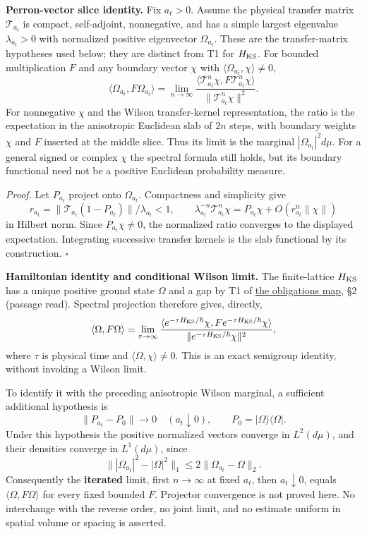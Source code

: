 \documentclass[11pt,a4paper]{article}
\begin{document}
\textbf{Perron-vector slice identity.} Fix \(a_t>0\). Assume the
physical transfer matrix \(\mathcal T_{a_t}\) is compact, self-adjoint,
nonnegative, and has a simple largest eigenvalue \(\lambda_{a_t}>0\)
with normalized positive eigenvector \(\Omega_{a_t}\). These are the
transfer-matrix hypotheses used below; they are distinct from T1 for
\(H_{\rm KS}\). For bounded multiplication \(F\) and any boundary vector
\(\chi\) with \(\langle\Omega_{a_t},\chi\rangle\ne0\),
\[\langle\Omega_{a_t},F\Omega_{a_t}\rangle
=\lim_{n\to\infty}
\frac{\langle\mathcal T_{a_t}^{n}\chi,
F\mathcal T_{a_t}^{n}\chi\rangle}
{\|\mathcal T_{a_t}^{n}\chi\|^2}.\] For nonnegative \(\chi\) and the
Wilson transfer-kernel representation, the ratio is the expectation in
the anisotropic Euclidean slab of \(2n\) steps, with boundary weights
\(\chi\) and \(F\) inserted at the middle slice. Thus its limit is the
marginal \(|\Omega_{a_t}|^2d\mu\). For a general signed or complex
\(\chi\) the spectral formula still holds, but its boundary functional
need not be a positive Euclidean probability measure.

\emph{Proof.} Let \(P_{a_t}\) project onto \(\Omega_{a_t}\). Compactness
and simplicity give
\[r_{a_t}=\|\mathcal T_{a_t}(1-P_{a_t})\|/\lambda_{a_t}<1,
\qquad
\lambda_{a_t}^{-n}\mathcal T_{a_t}^n\chi
=P_{a_t}\chi+O(r_{a_t}^n\|\chi\|)\] in Hilbert norm. Since
\(P_{a_t}\chi\ne0\), the normalized ratio converges to the displayed
expectation. Integrating successive transfer kernels is the slab
functional by its construction. \(\square\)

\textbf{Hamiltonian identity and conditional Wilson limit.} The
finite-lattice \(H_{\rm KS}\) has a unique positive ground state
\(\Omega\) and a gap by T1 of \href{mass-gap-obligations-lattice.md}{the
obligations map}, §2 (passage read). Spectral projection therefore
gives, directly, \[\langle\Omega,F\Omega\rangle
=\lim_{\tau\to\infty}
\frac{\langle e^{-\tau H_{\rm KS}/\hbar}\chi,
F e^{-\tau H_{\rm KS}/\hbar}\chi\rangle}
{\|e^{-\tau H_{\rm KS}/\hbar}\chi\|^2},\] where \(\tau\) is physical
time and \(\langle\Omega,\chi\rangle\ne0\). This is an exact semigroup
identity, without invoking a Wilson limit.

To identify it with the preceding anisotropic Wilson marginal, a
sufficient additional hypothesis is
\[\|P_{a_t}-P_0\|\longrightarrow0\quad(a_t\downarrow0),
\qquad P_0=|\Omega\rangle\langle\Omega|.\] Under this hypothesis the
positive normalized vectors converge in \(L^2(d\mu)\), and their
densities converge in \(L^1(d\mu)\), since
\[\big\||\Omega_{a_t}|^2-|\Omega|^2\big\|_1
\le2\|\Omega_{a_t}-\Omega\|_2.\] Consequently the \textbf{iterated}
limit, first \(n\to\infty\) at fixed \(a_t\), then \(a_t\downarrow0\),
equals \(\langle\Omega,F\Omega\rangle\) for every fixed bounded \(F\).
Projector convergence is not proved here. No interchange with the
reverse order, no joint limit, and no estimate uniform in spatial volume
or spacing is asserted.
\end{document}
